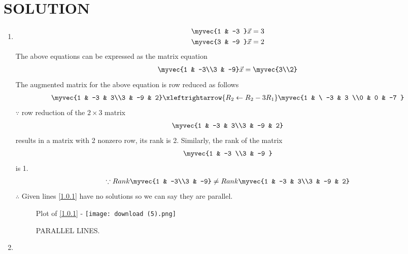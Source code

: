 \documentclass[journal,12pt,twocolumn]{IEEEtran}
\begin{document}
\section{SOLUTION}  
\begin{enumerate}
\item
\begin{align}
\begin{split}
\myvec{1 & -3 }\vec{x}&=3
\\
\myvec{3 & -9 }\vec{x}&=2
\end{split}
\end{align}
The above equations can be expressed as the matrix equation
\begin{align}
\myvec{1 & -3\\3 & -9} \vec{x} = \myvec{3\\2}
\end{align}
%
The augmented matrix for the above equation is row reduced as follows
\begin{align}
\myvec{1 & -3 & 3\\3 & -9 & 2} 
\xleftrightarrow {R_2\leftarrow R_2 -3R_1}\myvec{1 & \ -3 & 3 \\0 & 0 & -7 }
\end{align}
%
$\because$ row reduction of the $2\times 3$ matrix
%
\begin{align}
\myvec{1 & -3 & 3\\3 & -9 & 2} 
\end{align}
%
results in a matrix with 2 nonzero row, its rank is 2. 
%
Similarly, the rank of the matrix 
\begin{align}
\myvec{1 & -3 \\3 & -9 } 
\end{align}
%
is 1.
%
\begin{align}
\because Rank \myvec{1 & -3\\3 & -9} \ne Rank\myvec{1 & -3 & 3\\3 & -9 & 2} \nonumber\\
\end{align}
$\therefore$ Given lines \eqref{1.0.1} have no solutions so we can say they are parallel.
\begin{figure}[ht!]
Plot of \eqref{1.0.1} - 
\centering
\texttt{[image: download (5).png]}
\caption{PARALLEL LINES.}
\label{figure: parallel lines.}
\end{figure}
\item
\begin{align}
\begin{split}

\end{split}
\end{align}
\end{enumerate}
\end{document}
